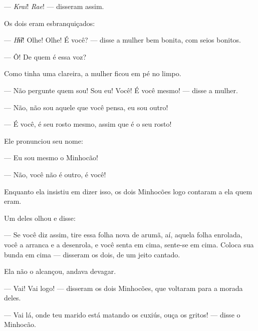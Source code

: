 --- \textit{Krai}! \textit{Rae}! --- disseram assim. 

Os dois eram esbranquiçados: 

--- \textit{Hɨ̃ɨ}! Olhe! Olhe! É você? --- disse a mulher bem bonita, com seios
bonitos.

--- Ô! De quem é essa voz?

Como tinha uma clareira, a mulher ficou em pé no limpo. 

--- Não pergunte quem sou! Sou eu! Você! É você mesmo! --- disse a
mulher.

--- Não, não sou aquele que você pensa, eu sou outro! 

--- É você, é seu rosto mesmo, assim que é o seu rosto! 

Ele pronunciou seu nome: 

--- Eu sou mesmo o Minhocão!

--- Não, você não é outro, é você! 

Enquanto ela insistiu em dizer isso, os dois Minhocões logo contaram a ela quem eram. 

Um deles olhou e disse: 

--- Se você diz assim, tire essa folha nova de arumã, aí, aquela folha
enrolada, você a arranca e a desenrola, e você senta em cima, sente-se
em cima. Coloca sua bunda em cima --- disseram os dois, de um jeito
cantado. 


Ela não o alcançou, andava devagar. 


--- Vai! Vai logo! --- disseram os dois Minhocões, que voltaram para a
morada deles. 


--- Vai lá, onde teu marido está matando os cuxiús, ouça os gritos! ---
disse o Minhocão. 

